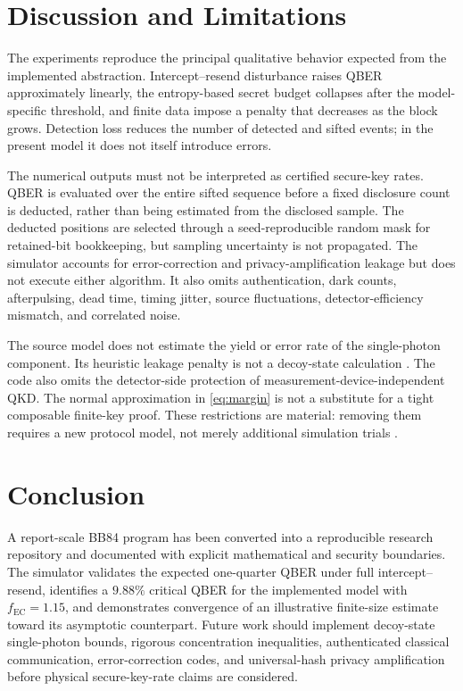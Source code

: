 \documentclass[conference]{IEEEtran}
\begin{document}
\section{Discussion and Limitations}

The experiments reproduce the principal qualitative behavior expected from
the implemented abstraction. Intercept--resend disturbance raises QBER
approximately linearly, the entropy-based secret budget collapses after the
model-specific threshold, and finite data impose a penalty that decreases as
the block grows. Detection loss reduces the number of detected and sifted
events; in the present model it does not itself introduce errors.

The numerical outputs must not be interpreted as certified secure-key rates.
QBER is evaluated over the entire sifted sequence before a fixed disclosure
count is deducted, rather than being estimated from the disclosed sample. The
deducted positions are selected through a seed-reproducible random mask for
retained-bit bookkeeping, but sampling uncertainty is not propagated. The
simulator accounts for error-correction and privacy-amplification leakage but
does not execute either algorithm. It also
omits authentication, dark counts, afterpulsing, dead time, timing jitter,
source fluctuations, detector-efficiency mismatch, and correlated noise.

The source model does not estimate the yield or error rate of the single-photon
component. Its heuristic leakage penalty is not a decoy-state calculation
\cite{lo2005,ma2005}. The code also omits the detector-side protection of
measurement-device-independent QKD. The normal approximation in
\eqref{eq:margin} is not a substitute for a tight composable finite-key proof.
These restrictions are material: removing them requires a new protocol model,
not merely additional simulation trials \cite{scarani2009,xu2020}.

\section{Conclusion}

A report-scale BB84 program has been converted into a reproducible research
repository and documented with explicit mathematical and security boundaries.
The simulator validates the expected one-quarter QBER under full
intercept--resend, identifies a \(9.88\%\) critical QBER for the implemented
model with \(f_{\mathrm{EC}}=1.15\), and demonstrates convergence of an
illustrative finite-size estimate toward its asymptotic counterpart. Future
work should implement decoy-state single-photon bounds, rigorous concentration
inequalities, authenticated classical communication, error-correction codes,
and universal-hash privacy amplification before physical secure-key-rate
claims are considered.
\end{document}
